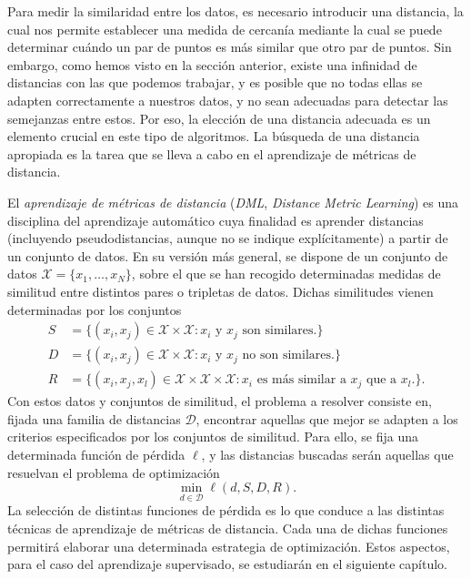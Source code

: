     Para medir la similaridad entre los datos, es necesario introducir una distancia, la cual nos permite establecer una medida de cercanía mediante la cual se puede determinar cuándo un par de puntos es más similar que otro par de puntos. Sin embargo, como hemos visto en la sección anterior, existe una infinidad de distancias con las que podemos trabajar, y es posible que no todas ellas se adapten correctamente a nuestros datos, y no sean adecuadas para detectar las semejanzas entre estos. Por eso, la elección de una distancia adecuada es un elemento crucial en este tipo de algoritmos. La búsqueda de una distancia apropiada es la tarea que se lleva a cabo en el aprendizaje de métricas de distancia.

    El \emph{aprendizaje de métricas de distancia} (\emph{DML}, \emph{Distance Metric Learning}) es una disciplina del aprendizaje automático cuya finalidad es aprender distancias (incluyendo pseudodistancias, aunque no se indique explícitamente) a partir de un conjunto de datos. En su versión más general, se dispone de un conjunto de datos $\mathcal{X} = \{x_1,\dots,x_N\}$, sobre el que se han recogido determinadas medidas de similitud entre distintos pares o tripletas de datos. Dichas similitudes vienen determinadas por los conjuntos
    \begin{align*}
        S &= \{(x_i,x_j) \in \mathcal{X}\times\mathcal{X} \colon x_i \text{ y } x_j \text{ son similares.} \} \\
        D &= \{(x_i,x_j) \in \mathcal{X}\times\mathcal{X} \colon x_i \text{ y } x_j \text{ no son similares.} \} \\
        R &= \{(x_i,x_j,x_l) \in \mathcal{X}\times\mathcal{X}\times\mathcal{X} \colon x_i \text{ es más similar a } x_j \text{ que a } x_l. \}.
    \end{align*}
    Con estos datos y conjuntos de similitud, el problema a resolver consiste en, fijada una familia de distancias $\mathcal{D}$, encontrar aquellas que mejor se adapten a los criterios especificados por los conjuntos de similitud. Para ello, se fija una determinada función de pérdida $\ell$, y las distancias buscadas serán aquellas que resuelvan el problema de optimización
    \[ \min_{d \in \mathcal{D}} \ell(d,S,D,R) .\]
    La selección de distintas funciones de pérdida es lo que conduce a las distintas técnicas de aprendizaje de métricas de distancia. Cada una de dichas funciones permitirá elaborar una determinada estrategia de optimización. Estos aspectos, para el caso del aprendizaje supervisado, se estudiarán en el siguiente capítulo.

